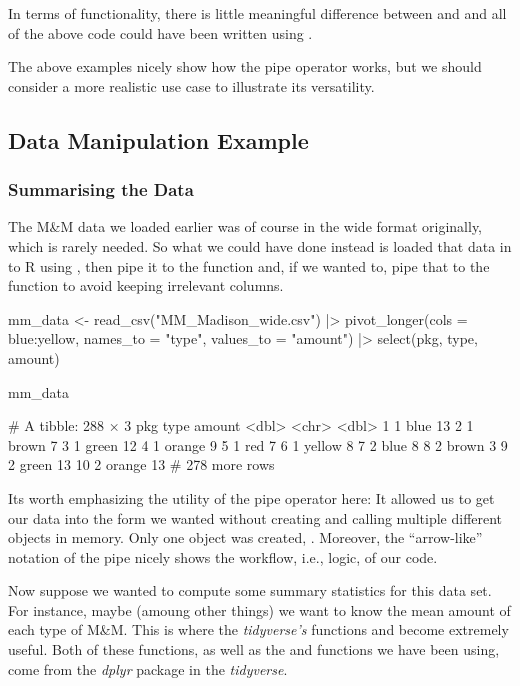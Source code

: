 In terms of functionality, there is little meaningful difference between \R{|>} and \R{\%>\%} and all of the above code could have been written using \R{\%>\%}.


The above examples nicely show how the pipe operator works, but we should consider a more realistic use case to illustrate its versatility. 

\subsection{Data Manipulation Example}

\subsubsection{Summarising the Data}

The M\&M data we loaded earlier was of course in the wide format originally, which is rarely needed. So what we could have done instead is loaded that data in to R using , then pipe it to the  function and, if we wanted to, pipe that to the  function to avoid keeping irrelevant columns.

\begin{inR}
mm_data <- read_csv("MM_Madison_wide.csv") |>
  pivot_longer(cols = blue:yellow, names_to = "type", values_to = "amount") |>
  select(pkg, type, amount)

mm_data
\end{inR}
\begin{outR}
# A tibble: 288 × 3
     pkg type   amount
   <dbl> <chr>   <dbl>
 1     1 blue       13
 2     1 brown       7
 3     1 green      12
 4     1 orange      9
 5     1 red         7
 6     1 yellow      8
 7     2 blue        8
 8     2 brown       3
 9     2 green      13
10     2 orange     13
# 278 more rows
\end{outR}

Its worth emphasizing the utility of the pipe operator here: It allowed us to get our data into the form we wanted without creating and calling multiple different objects in memory. Only one object was created, . Moreover, the ``arrow-like'' notation of the pipe \R{|>} nicely shows the workflow, i.e., logic, of our code.

Now suppose we wanted to compute some summary statistics for this data set.  For instance, maybe (amoung other things) we want to know the mean amount of each type of M\&M. This is where the \textit{tidyverse's} functions  and  become extremely useful. Both of these functions, as well as the  and  functions we have been using, come from the \textit{dplyr} package in the \textit{tidyverse}. 

